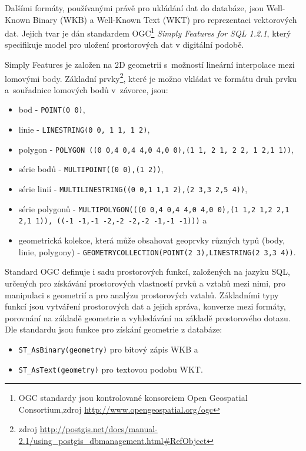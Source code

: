 Dalšími formáty, používanými právě pro ukládání dat do databáze, jsou Well-Known Binary (WKB) a Well-Known Text (WKT) pro reprezentaci vektorových dat. Jejich tvar je dán standardem OGC\footnote{OGC standardy jsou kontrolované konsorciem Open Geospatial Consortium,\newline zdroj \url{http://www.opengeospatial.org/ogc}} {\it Simply Features for SQL 1.2.1}, který specifikuje model pro uložení prostorových dat v digitální podobě. 

Simply Features je založen na 2D geometrii s~možností lineární interpolace mezi lomovými body. Základní prvky\footnote{zdroj \url {http://postgis.net/docs/manual-2.1/using\_postgis\_dbmanagement.html\#RefObject}}, které je možno vkládat ve formátu druh prvku a~souřadnice lomových bodů v~závorce, jsou:
\begin{itemize}
\item bod - \texttt{POINT(0 0)},
\item linie - \texttt{LINESTRING(0 0, 1 1, 1 2)},
\item polygon - \texttt{POLYGON ((0 0,4 0,4 4,0 4,0 0),(1 1, 2 1, 2 2, 1 2,1 1))},
\item série bodů - \texttt{MULTIPOINT((0 0),(1 2))},
\item série linií - \texttt{MULTILINESTRING((0 0,1 1,1 2),(2 3,3 2,5 4))},
\item série polygonů - \texttt{MULTIPOLYGON(((0 0,4 0,4 4,0 4,0 0),(1 1,2 1,2 2,1 2,1 1)), ((-1 -1,-1 -2,-2 -2,-2 -1,-1 -1)))} a
\item geometrická kolekce, která může obsahovat geoprvky různých typů (body, linie, polygony) - \texttt{GEOMETRYCOLLECTION(POINT(2 3),LINESTRING(2 3,3 4))}.
\end{itemize}

Standard OGC definuje i sadu prostorových funkcí, založených na jazyku SQL, určených pro získávání prostorových vlastností prvků a vztahů mezi nimi, pro ma\-ni\-pu\-la\-ci s geometrií a pro analýzu prostorových vztahů. Základními typy funkcí jsou vytváření prostorových dat a jejich správa, konverze mezi formáty, porovnání na základě geometrie a vyhledávání na základě prostorového dotazu. Dle standardu jsou funkce pro získání geometrie z databáze:
\begin{itemize}
\item \texttt{ST\_AsBinary(geometry)} pro bitový zápis WKB a
\item \texttt{ST\_AsText(geometry)} pro textovou podobu WKT.
     \end{itemize}


